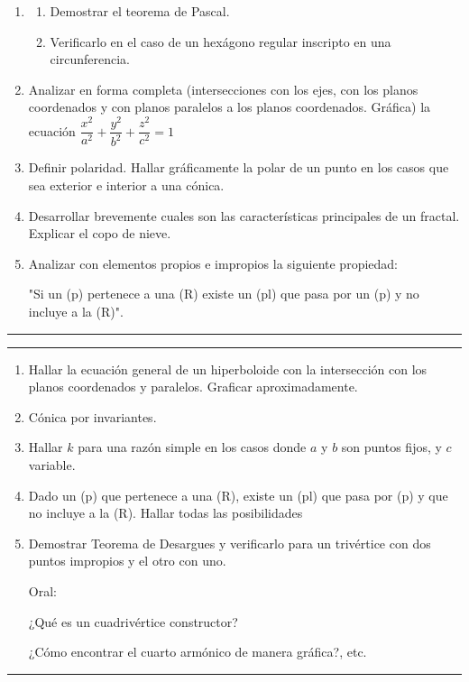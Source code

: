 \documentclass[9pt,a4paper]{extarticle}
\begin{document}
\begin{enumerate}
\item
    \begin{enumerate}
        \item Demostrar  el teorema de Pascal.
        \item Verificarlo en el caso de un hexágono regular inscripto en una circunferencia.
    \end{enumerate}

\item Analizar en forma completa (intersecciones con los ejes, con los planos coordenados y con planos paralelos a los planos coordenados. Gráfica)
la ecuación  $\dfrac{x^2}{a^2} + \dfrac{y^2}{b^2} + \dfrac{z^2}{c^2} = 1$

\item Definir polaridad. Hallar gráficamente  la polar de un punto en los casos que sea exterior e interior a una cónica.


\item Desarrollar brevemente cuales son las características principales  de un fractal. Explicar el copo de nieve. 

 \item Analizar con elementos propios e impropios la siguiente propiedad:

"Si un (p)  pertenece a una  (R) existe un (pl) que pasa por un (p)  y no incluye a la  (R)".

\end{enumerate}
\hrule

\newpage
\hrule
{}

\begin{enumerate}
Escrito:


\item Hallar la ecuación general de un hiperboloide con la intersección con los planos coordenados y paralelos. Graficar aproximadamente.


\item Cónica por invariantes.


\item Hallar $k$ para una razón simple en los casos donde $a$ y $b$ son puntos fijos, y $c$ variable.


\item Dado un (p) que pertenece a una (R), existe un (pl) que pasa por (p) y que no incluye a la (R). Hallar todas las posibilidades


\item Demostrar Teorema de Desargues y verificarlo para un trivértice con dos puntos impropios y el otro con uno.

Oral:

¿Qué es un cuadrivértice constructor?

¿Cómo encontrar el cuarto armónico de manera gráfica?, etc.

\end{enumerate}
\hrule
\end{document}
